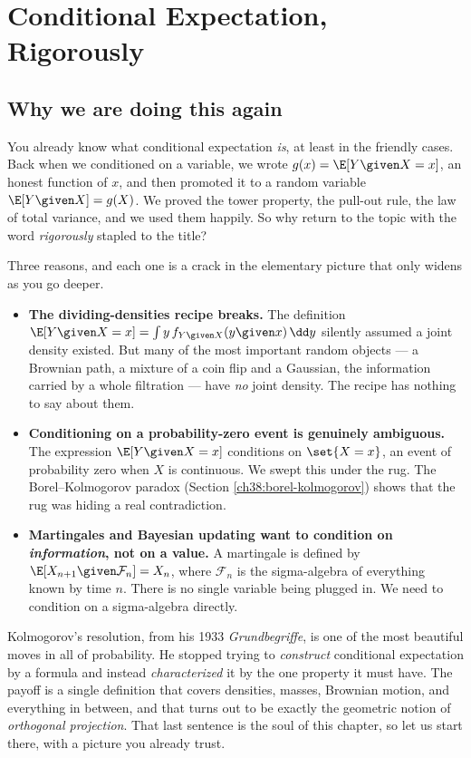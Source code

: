 \chapter{Conditional Expectation, Rigorously}

\section{Why we are doing this again}
\label{ch38:why-again}

You already know what conditional expectation \emph{is}, at least in the friendly cases. Back when
we conditioned on a variable, we wrote $g(x) = \E[Y \given X = x]$, an honest function of $x$, and
then promoted it to a random variable $\E[Y \given X] = g(X)$. We proved the tower property, the
pull-out rule, the law of total variance, and we used them happily. So why return to the topic with
the word \emph{rigorously} stapled to the title?

Three reasons, and each one is a crack in the elementary picture that only widens as you go deeper.

\begin{itemize}
  \item \textbf{The dividing-densities recipe breaks.} The definition $\E[Y \given X = x] = \int y\,
    f_{Y \given X}(y \given x)\,\dd y$ silently assumed a joint density existed. But many of the most
    important random objects --- a Brownian path, a mixture of a coin flip and a Gaussian, the
    information carried by a whole filtration --- have \emph{no} joint density. The recipe has nothing
    to say about them.
  \item \textbf{Conditioning on a probability-zero event is genuinely ambiguous.} The expression
    $\E[Y \given X = x]$ conditions on $\set{X = x}$, an event of probability zero when $X$ is
    continuous. We swept this under the rug. The Borel--Kolmogorov paradox (Section
    \ref{ch38:borel-kolmogorov}) shows that the rug was hiding a real contradiction.
  \item \textbf{Martingales and Bayesian updating want to condition on \emph{information}, not on a
    value.} A martingale is defined by $\E[X_{n+1} \given \mathcal{F}_n] = X_n$, where $\mathcal{F}_n$
    is the sigma-algebra of everything known by time $n$. There is no single variable being plugged
    in. We need to condition on a sigma-algebra directly.
\end{itemize}

Kolmogorov's resolution, from his 1933 \emph{Grundbegriffe}, is one of the most beautiful moves in
all of probability. He stopped trying to \emph{construct} conditional expectation by a formula and
instead \emph{characterized} it by the one property it must have. The payoff is a single definition
that covers densities, masses, Brownian motion, and everything in between, and that turns out to be
exactly the geometric notion of \emph{orthogonal projection}. That last sentence is the soul of this
chapter, so let us start there, with a picture you already trust.

